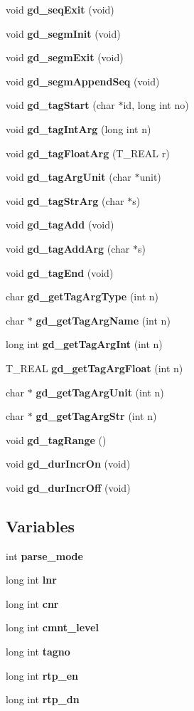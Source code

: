 \begin{CompactItemize}
void {\bf gd\_\-seq\-Exit} (void)
\item 
void {\bf gd\_\-segm\-Init} (void)
\item 
void {\bf gd\_\-segm\-Exit} (void)
\item 
void {\bf gd\_\-segm\-Append\-Seq} (void)
\item 
void {\bf gd\_\-tag\-Start} (char $\ast$id, long int no)
\item 
void {\bf gd\_\-tag\-Int\-Arg} (long int n)
\item 
void {\bf gd\_\-tag\-Float\-Arg} (T\_\-REAL r)
\item 
void {\bf gd\_\-tag\-Arg\-Unit} (char $\ast$unit)
\item 
void {\bf gd\_\-tag\-Str\-Arg} (char $\ast$s)
\item 
void {\bf gd\_\-tag\-Add} (void)
\item 
void {\bf gd\_\-tag\-Add\-Arg} (char $\ast$s)
\item 
void {\bf gd\_\-tag\-End} (void)
\item 
char {\bf gd\_\-get\-Tag\-Arg\-Type} (int n)
\item 
char $\ast$ {\bf gd\_\-get\-Tag\-Arg\-Name} (int n)
\item 
long int {\bf gd\_\-get\-Tag\-Arg\-Int} (int n)
\item 
T\_\-REAL {\bf gd\_\-get\-Tag\-Arg\-Float} (int n)
\item 
char $\ast$ {\bf gd\_\-get\-Tag\-Arg\-Unit} (int n)
\item 
char $\ast$ {\bf gd\_\-get\-Tag\-Arg\-Str} (int n)
\item 
void {\bf gd\_\-tag\-Range} ()
\item 
void {\bf gd\_\-dur\-Incr\-On} (void)
\item 
void {\bf gd\_\-dur\-Incr\-Off} (void)
\end{CompactItemize}
\subsection*{Variables}
\begin{CompactItemize}
\item 
int {\bf parse\_\-mode}
\item 
long int {\bf lnr}
\item 
long int {\bf cnr}
\item 
long int {\bf cmnt\_\-level}
\item 
long int {\bf tagno}
\item 
long int {\bf rtp\_\-en}
\item 
long int {\bf rtp\_\-dn}
\end{CompactItemize}



